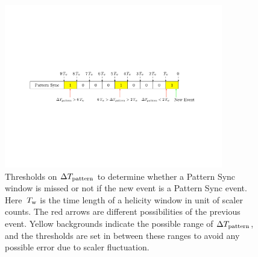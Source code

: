 \begin{figure}[tb!]
  \centering
  \includegraphics[width=0.85\textwidth]{figs/tir-helicity-seed.pdf}
  \caption[Determine the radom seed for TIR helicity.]{Thresholds on $\Delta T_{\text{pattern}}$ to determine whether a Pattern Sync window is missed or not if the new event is a Pattern Sync event. Here $\,T_{\text{w}}$ is the time length of a helicity window in unit of scaler counts. The red arrows are different possibilities of the previous event. Yellow backgrounds indicate the possible range of $\Delta T_{\text{pattern}}$, and the thresholds are set in between these ranges to avoid any possible error due to scaler fluctuation. \label{A1S2SS2F2}}
\end{figure}

